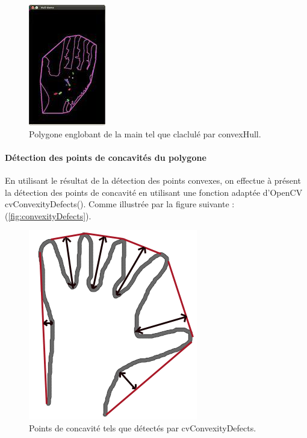 \begin{figure}[htb!]
\centerline{\includegraphics{convexePolygone.jpg}}
\caption{Polygone englobant de la main tel que claclulé par convexHull.}
\label{fig:convexePolygone}
\end{figure}

\paragraph{Détection des points de concavités du polygone}
En utilisant le résultat de la détection des points convexes, on effectue à présent la détection des points de concavité en utilisant une fonction adaptée d’OpenCV cvConvexityDefects(). Comme illustrée par la figure suivante : (\autoref{fig:convexityDefects}).

\begin{figure}[htb!]
\centerline{\includegraphics[scale=0.6]{convexityDefects.png}}
\caption{Points de concavité tels que détectés par cvConvexityDefects.}
\label{fig:convexityDefects}
\end{figure}

